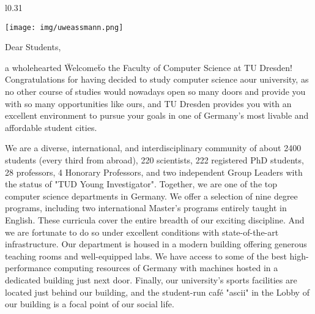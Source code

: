 
\begin{wrapfigure}{l}{0.31\textwidth}
  \vspace{-12pt}
  \begin{centering}
    \texttt{[image: img/uweassmann.png]}
  \end{centering}
  \vspace{-15pt}
\end{wrapfigure}

{\fontsize{10pt}{11}\selectfont
Dear Students,

a wholehearted \"Welcome\" to the Faculty of Computer Science at TU Dresden! Congratulations for having decided to study computer science aour university, as no other course of studies would nowadays open so many doors and provide you with so many opportunities like ours, and TU Dresden provides you with an excellent environment to pursue your goals in one of Germany’s most livable and affordable student cities.

We are a diverse, international, and interdisciplinary community of about 2400 students (every third from abroad), 220 scientists, 222 registered PhD students, 28 professors, 4 Honorary Professors, and two independent Group Leaders with the status of "TUD Young Investigator". Together, we are one of the top computer science departments in Germany. We offer a selection of nine degree programs, including two international Master’s programs entirely taught in English. These curricula cover the entire breadth of our exciting discipline. And we are fortunate to do so under excellent conditions with state-of-the-art infrastructure. Our department is housed in a modern building offering generous teaching rooms and well-equipped labs. We have access to some of the best high-performance computing resources of Germany with machines hosted in a dedicated building just next door. Finally, our university's sports facilities are located just behind our building, and the student-run café "ascii" in the Lobby of our building is a focal point of our social life.

}
